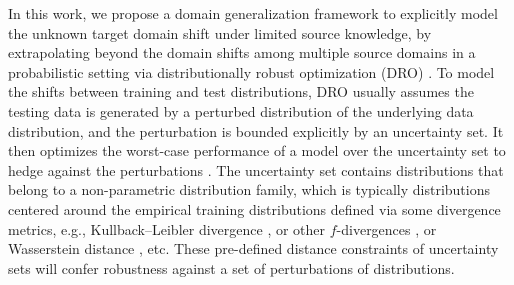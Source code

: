 \documentclass[journal]{IEEEtran}
\begin{document}
In this work, we propose a domain generalization framework to explicitly model the unknown target domain shift under limited source knowledge,
by extrapolating beyond the domain shifts among multiple source domains in a probabilistic setting via distributionally robust optimization (DRO) \cite{bagnell2005robust}.
To model the shifts between training and test distributions,
DRO usually assumes the testing data is generated by a perturbed distribution of the underlying data distribution, and the perturbation is bounded explicitly by an uncertainty set. It then optimizes the worst-case performance of a model over the uncertainty set to hedge against the perturbations \cite{sinha2017certifying,gao2018robust,zhu2020distributionally,rahimian2019distributionally}. 
The uncertainty set contains distributions that belong to a non-parametric distribution family, which is typically distributions centered around the empirical training distributions defined via some divergence metrics, e.g., Kullback–Leibler divergence \cite{bagnell2005robust}, or other $f$-divergences
\cite{ben2013robust,duchi2016statistics,namkoong2016stochastic,duchi2021learning}, or Wasserstein distance \cite{sinha2017certifying,blanchet2019robust,lee2018minimax,mohajerin2018data,staib2017distributionally}, etc.
These pre-defined distance constraints of uncertainty sets will confer robustness against a set of perturbations of distributions. %
\end{document}

